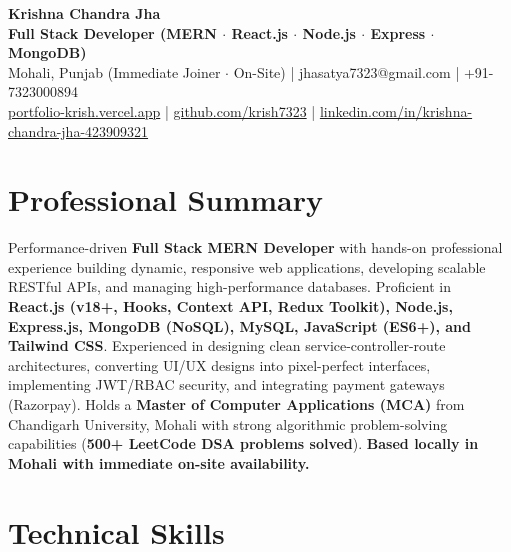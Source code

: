 \documentclass[a4paper,10pt]{article}
\begin{document}
\begin{center}

    {\LARGE \textbf{Krishna Chandra Jha}} \\[2.5pt]

    \textbf{Full Stack Developer (MERN $\cdot$ React.js $\cdot$ Node.js $\cdot$ Express $\cdot$ MongoDB)} \\[3.5pt]

    Mohali, Punjab (Immediate Joiner $\cdot$ On-Site)
    \quad | \quad
    jhasatya7323@gmail.com
    \quad | \quad
    +91-7323000894
    \\[2.5pt]

    \href{https://portfolio-ashen-alpha-dv0whhsamo.vercel.app/}{portfolio-krish.vercel.app}
    \quad | \quad
    \href{https://github.com/krish7323}{github.com/krish7323}
    \quad | \quad
    \href{https://linkedin.com/in/krishna-chandra-jha-423909321}
    {linkedin.com/in/krishna-chandra-jha-423909321}

\end{center}

\section*{Professional Summary}

Performance-driven \textbf{Full Stack MERN Developer} with hands-on professional experience building dynamic, responsive web applications, developing scalable RESTful APIs, and managing high-performance databases. Proficient in \textbf{React.js (v18+, Hooks, Context API, Redux Toolkit), Node.js, Express.js, MongoDB (NoSQL), MySQL, JavaScript (ES6+), and Tailwind CSS}. Experienced in designing clean service-controller-route architectures, converting UI/UX designs into pixel-perfect interfaces, implementing JWT/RBAC security, and integrating payment gateways (Razorpay). Holds a \textbf{Master of Computer Applications (MCA)} from Chandigarh University, Mohali with strong algorithmic problem-solving capabilities (\textbf{500+ LeetCode DSA problems solved}). \textbf{Based locally in Mohali with immediate on-site availability.}

\section*{Technical Skills}
\end{document}
